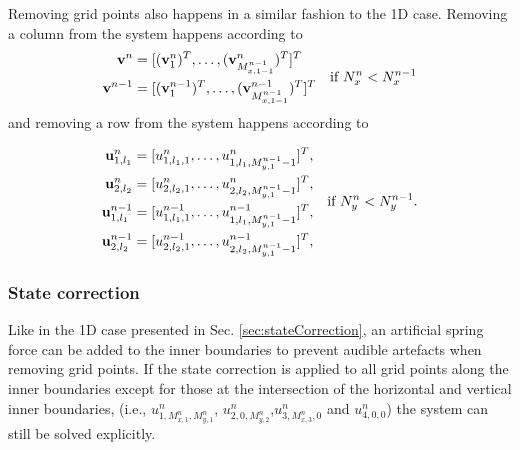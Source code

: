 \documentclass[fleqn]{jaes}
\begin{document}
Removing grid points also happens in a similar fashion to the 1D case. Removing a column from the system happens according to 
\begin{equation}
\begin{aligned}
    \v^n &= [(\v_1^n)^T, \hdots, (\v_{M_{x,1-1}^{n-1}}^n)^T]^T\\
    \v^{n-1} &= [(\v_1^{n-1})^T, \hdots, (\v_{M_{x,1-1}^{n-1}}^{n-1})^T]^T
    \end{aligned}
\quad \text{if } N_x^n < N_x^{n-1}
\end{equation}
and removing a row from the system happens according to

\begin{equation}
    \begin{aligned}
        \u_{1,l_1}^n &= [u_{1,l_1, 1}^n, \hdots, u_{1,l_1, M_{y,1}^{n-1}-1}^n]^T,\\
        \u_{2,l_2}^n &= [u_{2,l_2, 1}^n,\hdots, u^n_{2,l_2, M_{y, 1}^{n-1}-1}]^T,\\
        \u_{1,l_1}^{n-1} &= [u_{1,l_1, 1}^{n-1}, \hdots, u_{1,l_1, M_{y,1}^{n-1}-1}^{n-1}]^T,\\
        \u_{2,l_2}^{n-1} &= [u_{2,l_2, 1}^{n-1},\hdots, u^{n-1}_{2,l_2, M_{y, 1}^{n-1}-1}]^T,
    \end{aligned}\quad \text{if } N_y^n < N_y^{n-1}.
\end{equation}
\subsubsection{State correction}
Like in the 1D case presented in Sec. \ref{sec:stateCorrection}, an artificial spring force can be added to the inner boundaries to prevent audible artefacts when removing grid points. If the state correction is applied to all grid points along the inner boundaries except for those at the intersection of the horizontal and vertical inner boundaries, (i.e., $u_{1, M_{x,1}^n, M_{y,1}^n}^n$, $u_{2, 0, M_{y,2}^n}^n$,$u_{3, M_{x,3}^n, 0}^n$ and $u_{4, 0, 0}^n$) the system can still be solved explicitly.
\end{document}
